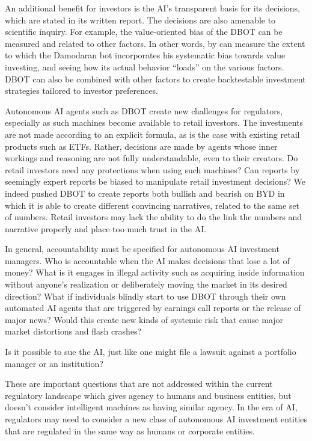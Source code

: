 \documentclass[]{interact}
\theoremstyle{plain}%
\theoremstyle{definition}
\theoremstyle{remark}
\begin{document}
An additional benefit for investors is the AI’s transparent basis for its decisions, which are stated in its written report. The decisions are also amenable to scientific inquiry. For example, the value-oriented bias of the DBOT can be measured and related to other factors. In other words, by can measure the extent to which the Damodaran bot incorporates his systematic bias towards value investing, and seeing how its actual behavior “loads” on the various factors. DBOT can also be combined with other factors to create backtestable investment strategies tailored to investor preferences. 

Autonomous AI agents such as DBOT create new challenges for regulators, especially as such machines become available to retail investors. The investments are not made according to an explicit formula, as is the case with existing retail products such as ETFs. Rather, decisions are made by agents whose inner workings and reasoning are not fully understandable, even to their creators. Do retail investors need any protections when using such machines? Can reports by seemingly expert reports be biased to manipulate retail investment decisions? We indeed pushed DBOT to create reports both bullish and bearish on BYD in which it is able to create different convincing narratives, related to the same set of numbers. Retail investors may lack the ability to do the link the numbers and narrative properly and place too much trust in the AI. 

In general, accountability must be specified for autonomous AI investment managers. Who is accountable when the AI makes decisions that lose a lot of money? What is it engages in illegal activity such as acquiring inside information without anyone’s realization or deliberately moving the market in its desired direction? What if individuals blindly start to use DBOT through their own automated AI agents that are triggered by earnings call reports or the release of  major news? Would this create new kinds of systemic risk that cause major market distortions and flash crashes? 

Is it possible to sue the AI, just like one might file a lawsuit against a portfolio manager or an institution?

These are important questions that are not addressed within the current regulatory landscape which gives agency to humans and business entities, but doesn’t consider intelligent machines as having similar agency. In the era of AI, regulators may need to consider a new class of autonomous AI investment entities that are regulated in the same way as humans or corporate entities. 
\end{document}
